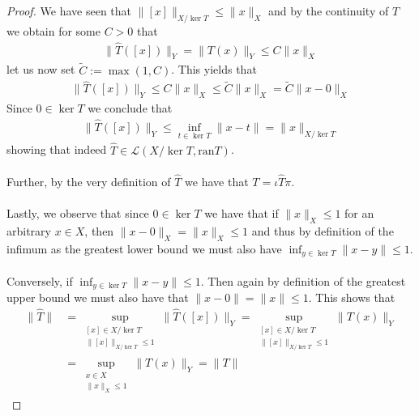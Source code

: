 \documentclass[12pt,a4paper]{article}
\theoremstyle{definition}
\begin{document}
\begin{proof}
\newpage
We have seen that $\|[x]\|_{X/\ker T} \leq \|x\|_X$ and by the continuity of $T$ we obtain for some $C>0$ that
\begin{align*}
\| \hat{T}([x])\|_Y = \| T(x)\|_Y \leq C \|x\|_X
\end{align*}
let us now set $\tilde{C}:= \max (1, C)$. This yields that
\begin{align*}
\| \hat{T}([x])\|_Y \leq C\|x\|_X \leq \tilde{C}\|x\|_X = \tilde{C} \|x-0\|_X
\end{align*}
Since $0 \in \ker T$ we conclude that
\begin{align*}
\| \hat{T}([x]) \|_Y \leq \inf_{t \in \ker T} \| x-t\| = \|x\|_{X/\ker T}
\end{align*}
showing that indeed $\hat{T} \in \mathcal{L}(X/ \ker T, \text{ran}T)$. \\
\\
Further, by the very definition of $ \hat{T}$ we have that $T= \iota \hat{T} \pi$. 
\\\\
Lastly, we observe that since $0 \in \ker T$ we have that if $\|x\|_X \leq 1$ for an arbitrary $x \in X$, then $\|x-0\|_X=\|x\|_X \leq 1$ and thus by definition of the infimum as the greatest lower bound we must also have $\inf_{y \in \ker T} \|x-y\| \leq 1$.
\\\\
Conversely, if $\inf_{y \in \ker T} \|x-y \| \leq 1$. Then again by definition of the greatest upper bound we must also have that $\|x-0\|=\|x\| \leq 1$. This shows that
\begin{align*}
\| \hat{T}\| &= \sup_{ \substack{ [x] \in X/ \ker T \\ \| [x]\|_{X / \ker T} \leq 1}} \| \hat{T}([x])\|_Y = \sup_{ \substack{ [x] \in X/ \ker T \\ \| [x]\|_{X / \ker T} \leq 1}} \| T(x)\|_Y \\
& = \sup_{\substack{ x \in X \\ \|x\|_X \leq 1 }} \| T(x)\|_Y = \|T\|
\end{align*}
\end{proof}
\newpage
\end{document}
